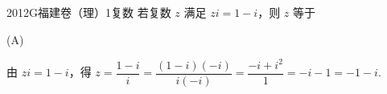 
\begin{problem}{2012}{G}{福建卷（理）}{1}{复数}
若复数 $ z $ 满足 $ zi=1-i $，则 $ z $ 等于
\begin{choices}
\end{choices}
\end{problem}

\begin{answer}
(A)
\end{answer}

\begin{solutions}
由 $ zi = 1 - i $，得 $ z = \dfrac{1 - i}{i} = \dfrac{(1 - i)(-i)}{i(-i)} = \dfrac{-i + i^2}{1} = -i - 1 = -1 - i $.
\end{solutions}